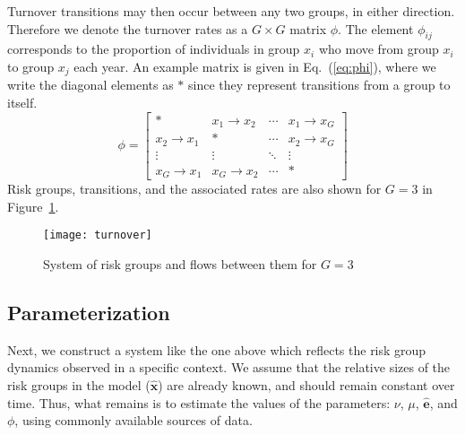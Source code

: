 Turnover transitions may then occur between any two groups, in either direction.
Therefore we denote the turnover rates as a $G \times G$ matrix $\phi$.
The element $\phi_{ij}$ corresponds to the proportion of individuals in group $x_i$
who move from group $x_i$ to group $x_j$ each year.
An example matrix is given in Eq.~(\ref{eq:phi}),
where we write the diagonal elements as $*$ since they represent
transitions from a group to itself.
\begin{equation}\label{eq:phi}
\phi = \left[\begin{array}{cccc}
	         *          & x_1  \rightarrow x_2 & \cdots & x_1 \rightarrow x_G \\[0.5em]
	x_2 \rightarrow x_1 &          *           & \cdots & x_2 \rightarrow x_G \\[0.5em]
	      \vdots        &        \vdots        & \ddots &       \vdots        \\[0.5em]
	x_G \rightarrow x_1 & x_G \rightarrow x_2  & \cdots &          *
\end{array}\right]
\end{equation}
Risk groups, transitions, and the associated rates
are also shown for $G = 3$ in Figure~\ref{fig:system-app}.
\begin{figure}
  \centering
  \texttt{[image: turnover]}
  \caption{System of risk groups and flows between them for $G = 3$}
  \label{fig:system-app}
\end{figure}
\subsection{Parameterization}
\label{aa:params}
Next, we construct a system like the one above
which reflects the risk group dynamics observed in a specific context.
We assume that the relative sizes of the risk groups in the model ($\bm{\hat{x}}$)
are already known, and should remain constant over time.
Thus, what remains is to estimate the values of the parameters:
$\nu$, $\mu$, $\bm{\hat{e}}$, and $\phi$,
using commonly available sources of data.
